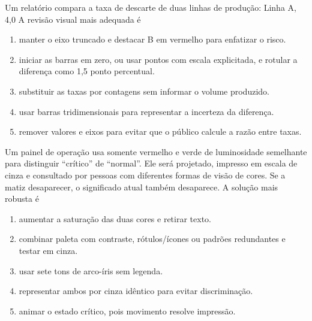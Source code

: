 \TextoBase Um relatório compara a taxa de descarte de duas linhas de produção: Linha A, 4,0%
\FonteDidatica
\Comando A revisão visual mais adequada é
\begin{enumerate}[label=\Alph*)]
\item manter o eixo truncado e destacar B em vermelho para enfatizar o risco.
\item iniciar as barras em zero, ou usar pontos com escala explicitada, e rotular a diferença como 1,5 ponto percentual.
\item substituir as taxas por contagens sem informar o volume produzido.
\item usar barras tridimensionais para representar a incerteza da diferença.
\item remover valores e eixos para evitar que o público calcule a razão entre taxas.
\end{enumerate}
\TextoBase Um painel de operação usa somente vermelho e verde de luminosidade semelhante para distinguir ``crítico'' de ``normal''. Ele será projetado, impresso em escala de cinza e consultado por pessoas com diferentes formas de visão de cores. Se a matiz desaparecer, o significado atual também desaparece.
\FonteDidatica
\Comando A solução mais robusta é
\begin{enumerate}[label=\Alph*)]\item aumentar a saturação das duas cores e retirar texto.\item combinar paleta com contraste, rótulos/ícones ou padrões redundantes e testar em cinza.\item usar sete tons de arco-íris sem legenda.\item representar ambos por cinza idêntico para evitar discriminação.\item animar o estado crítico, pois movimento resolve impressão.\end{enumerate}

